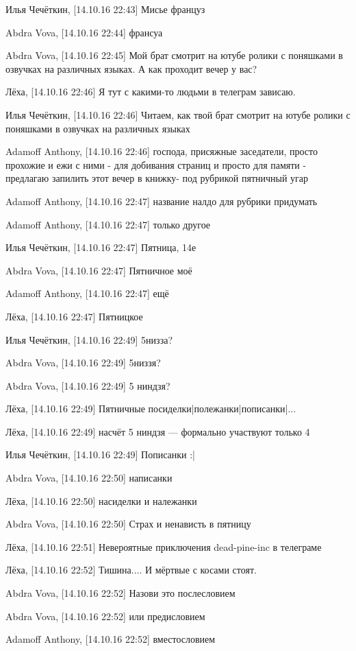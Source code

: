 Илья Чечёткин, [14.10.16 22:43]
Мисье француз

Abdra Vova, [14.10.16 22:44]
франсуа

Abdra Vova, [14.10.16 22:45]
Мой брат смотрит на ютубе ролики с поняшками в озвучках на различных языках. А как проходит вечер у вас?

Лёха, [14.10.16 22:46]
Я тут с какими-то людьми в телеграм зависаю.

Илья Чечёткин, [14.10.16 22:46]
Читаем, как твой брат смотрит на ютубе ролики с поняшками в озвучках на различных языках

Adamoff Anthony, [14.10.16 22:46]
господа, присяжные заседатели, просто прохожие и ежи с ними - для добивания страниц и просто для памяти - предлагаю запилить этот вечер в книжку- под рубрикой пятничный угар

Adamoff Anthony, [14.10.16 22:47]
название налдо для рубрики придумать

Adamoff Anthony, [14.10.16 22:47]
только другое

Илья Чечёткин, [14.10.16 22:47]
Пятница, 14е

Abdra Vova, [14.10.16 22:47]
Пятничное моё

Adamoff Anthony, [14.10.16 22:47]
ещё

Лёха, [14.10.16 22:47]
Пятницкое

Илья Чечёткин, [14.10.16 22:49]
5низза?

Abdra Vova, [14.10.16 22:49]
5низзя?

Abdra Vova, [14.10.16 22:49]
5 ниндзя?

Лёха, [14.10.16 22:49]
Пятничные посиделки|полежанки|пописанки|...

Лёха, [14.10.16 22:49]
насчёт 5 ниндзя — формально участвуют только 4

Илья Чечёткин, [14.10.16 22:49]
Пописанки :|

Abdra Vova, [14.10.16 22:50]
написанки

Лёха, [14.10.16 22:50]
насиделки и належанки

Abdra Vova, [14.10.16 22:50]
Страх и ненависть в пятницу

Лёха, [14.10.16 22:51]
Невероятные приключения dead-pine-inc в телеграме

Лёха, [14.10.16 22:52]
Тишина....
И мёртвые с косами стоят.

Abdra Vova, [14.10.16 22:52]
Назови это послесловием

Abdra Vova, [14.10.16 22:52]
или предисловием

Adamoff Anthony, [14.10.16 22:52]
вместословием


